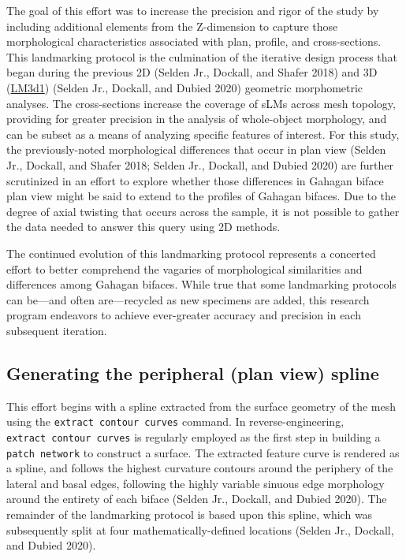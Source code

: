 \documentclass[
]{article}
\begin{document}
The goal of this effort was to increase the precision and rigor of the
study by including additional elements from the Z-dimension to capture
those morphological characteristics associated with plan, profile, and
cross-sections. This landmarking protocol is the culmination of the
iterative design process that began during the previous 2D (Selden Jr.,
Dockall, and Shafer 2018) and 3D
(\href{https://github.com/aksel-blaise/gahaganmorph2/blob/master/analysis/landmarking-protocol.md}{LM3d1})
(Selden Jr., Dockall, and Dubied 2020) geometric morphometric analyses.
The cross-sections increase the coverage of sLMs across mesh topology,
providing for greater precision in the analysis of whole-object
morphology, and can be subset as a means of analyzing specific features
of interest. For this study, the previously-noted morphological
differences that occur in plan view (Selden Jr., Dockall, and Shafer
2018; Selden Jr., Dockall, and Dubied 2020) are further scrutinized in
an effort to explore whether those differences in Gahagan biface plan
view might be said to extend to the profiles of Gahagan bifaces. Due to
the degree of axial twisting that occurs across the sample, it is not
possible to gather the data needed to answer this query using 2D
methods.

The continued evolution of this landmarking protocol represents a
concerted effort to better comprehend the vagaries of morphological
similarities and differences among Gahagan bifaces. While true that some
landmarking protocols can be---and often are---recycled as new specimens
are added, this research program endeavors to achieve ever-greater
accuracy and precision in each subsequent iteration.

\hypertarget{generating-the-peripheral-plan-view-spline}{%
\subsection{Generating the peripheral (plan view)
spline}\label{generating-the-peripheral-plan-view-spline}}

This effort begins with a spline extracted from the surface geometry of
the mesh using the \texttt{extract\ contour\ curves} command. In
reverse-engineering, \texttt{extract\ contour\ curves} is regularly
employed as the first step in building a \texttt{patch\ network} to
construct a surface. The extracted feature curve is rendered as a
spline, and follows the highest curvature contours around the periphery
of the lateral and basal edges, following the highly variable sinuous
edge morphology around the entirety of each biface (Selden Jr., Dockall,
and Dubied 2020). The remainder of the landmarking protocol is based
upon this spline, which was subsequently split at four
mathematically-defined locations (Selden Jr., Dockall, and Dubied 2020).
\end{document}
